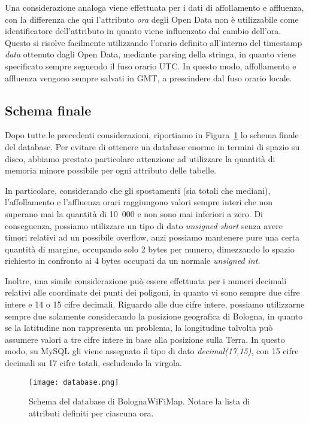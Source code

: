 Una considerazione analoga viene effettuata per i dati di affollamento e affluenza, con la differenza che qui l'attributo \textit{ora} degli Open Data non è utilizzabile come identificatore dell'attributo in quanto viene influenzato dal cambio dell'ora. Questo si risolve facilmente utilizzando l'orario definito all'interno del timestamp \textit{data} ottenuto dagli Open Data, mediante parsing della stringa, in quanto viene specificato sempre seguendo il fuso orario UTC. In questo modo, affollamento e affluenza vengono sempre salvati in GMT, a prescindere dal fuso orario locale.

\subsection{Schema finale}
Dopo tutte le precedenti considerazioni, riportiamo in Figura~\ref{fig:database} lo schema finale del database. Per evitare di ottenere un database enorme in termini di spazio su disco, abbiamo prestato particolare attenzione ad utilizzare la quantità di memoria minore possibile per ogni attributo delle tabelle.

In particolare, considerando che gli spostamenti (sia totali che mediani), l'affollamento e l'affluenza orari raggiungono valori sempre interi che non superano mai la quantità di 10~000 e non sono mai inferiori a zero. Di conseguenza, possiamo utilizzare un tipo di dato \textit{unsigned short} senza avere timori relativi ad un possibile overflow, anzi possiamo mantenere pure una certa quantità di margine, occupando solo 2 bytes per numero, dimezzando lo spazio richiesto in confronto ai 4 bytes occupati da un normale \textit{unsigned int}.

Inoltre, una simile considerazione può essere effettuata per i numeri decimali relativi alle coordinate dei punti dei poligoni, in quanto vi sono sempre due cifre intere e 14 o 15 cifre decimali. Riguardo alle due cifre intere, possiamo utilizzarne sempre due solamente considerando la posizione geografica di Bologna, in quanto se la latitudine non rappresenta un problema, la longitudine talvolta può assumere valori a tre cifre intere in base alla posizione sulla Terra. In questo modo, su MySQL gli viene assegnato il tipo di dato \textit{decimal(17,15)}, con 15 cifre decimali su 17 cifre totali, escludendo la virgola.

\begin{figure}[H]
    \centering
    \texttt{[image: database.png]}
    \caption[Schema del database]{Schema del database di BolognaWiFiMap. Notare la lista di attributi definiti per ciascuna ora.}
    \label{fig:database}
\end{figure}

